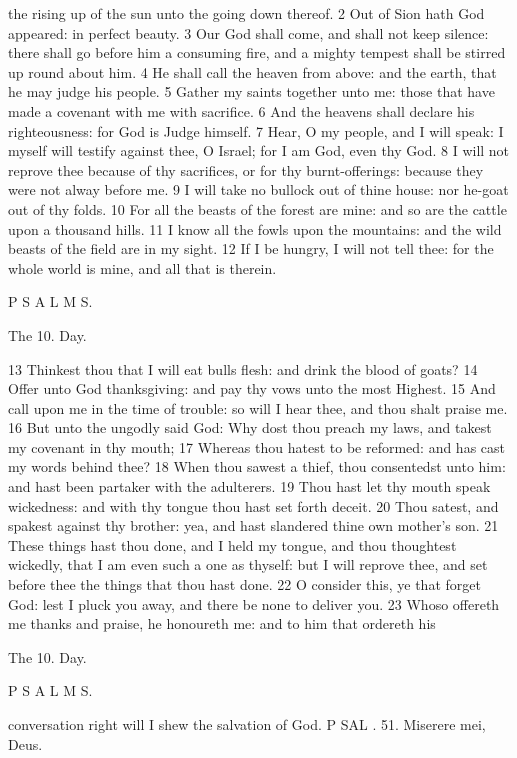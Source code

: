 the rising up of the sun unto the going down thereof. 2 Out of Sion hath God appeared: in perfect beauty. 3 Our God shall come, and shall not keep silence: there shall go before him a consuming fire, and a mighty tempest shall be stirred up round about him. 4 He shall call the heaven from above: and the earth, that he may judge his people. 5 Gather my saints together unto me: those that have made a covenant with me with sacrifice. 6 And the heavens shall declare his righteousness: for God is Judge himself. 7 Hear, O my people, and I will speak: I myself will testify against thee, O Israel; for I am God, even thy God. 8 I will not reprove thee because of thy sacrifices, or for thy burnt-offerings: because they were not alway before me. 9 I will take no bullock out of thine house: nor he-goat out of thy folds. 10 For all the beasts of the forest are mine: and so are the cattle upon a thousand hills. 11 I know all the fowls upon the mountains: and the wild beasts of the field are in my sight. 12 If I be hungry, I will not tell thee: for the whole world is mine, and all that is therein.

P S A L M S.

The 10. Day.

13 Thinkest thou that I will eat bulls flesh: and drink the blood of goats? 14 Offer unto God thanksgiving: and pay thy vows unto the most Highest. 15 And call upon me in the time of trouble: so will I hear thee, and thou shalt praise me. 16 But unto the ungodly said God: Why dost thou preach my laws, and takest my covenant in thy mouth; 17 Whereas thou hatest to be reformed: and has cast my words behind thee? 18 When thou sawest a thief, thou consentedst unto him: and hast been partaker with the adulterers. 19 Thou hast let thy mouth speak wickedness: and with thy tongue thou hast set forth deceit. 20 Thou satest, and spakest against thy brother: yea, and hast slandered thine own mother’s son. 21 These things hast thou done, and I held my tongue, and thou thoughtest wickedly, that I am even such a one as thyself: but I will reprove thee, and set before thee the things that thou hast done. 22 O consider this, ye that forget God: lest I pluck you away, and there be none to deliver you. 23 Whoso offereth me thanks and praise, he honoureth me: and to him that ordereth his

The 10. Day.

P S A L M S.

conversation right will I shew the salvation of God. P SAL . 51. Miserere mei, Deus.

